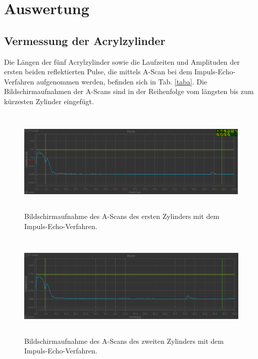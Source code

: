 \section{Auswertung}
\label{sec:Auswertung}

\subsection{Vermessung der Acrylzylinder}
Die Längen der fünf Acrylzylinder sowie die Laufzeiten und Amplituden
der ersten beiden reflektierten Pulse, %
die mittels A-Scan bei dem Impuls-Echo-Verfahren aufgenommen werden, %
befinden sich in Tab. \ref{taba}.
Die Bildschirmaufnahmen der A-Scans sind in der Reihenfolge
vom längsten bis zum kürzesten Zylinder eingefügt.



\begin{figure}
    \centering
    \includegraphics[width=15cm, height=5cm]{build/Messung1.1.png}
    \caption{Bildschirmaufnahme des A-Scans des ersten Zylinders mit dem Impuls-Echo-Verfahren.}
    \label{m1.1}
\end{figure}

\begin{figure}
    \centering
    \includegraphics[width=15cm, height=5cm]{build/Messung1.2.png}
    \caption{Bildschirmaufnahme des A-Scans des zweiten Zylinders mit dem Impuls-Echo-Verfahren.}
    \label{m1.2}
\end{figure}

